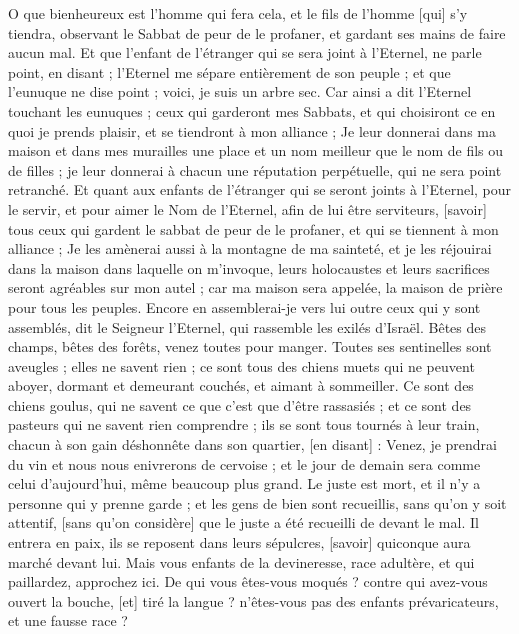 \begin{multicols}{2}
O que bienheureux est l'homme qui fera cela, et le fils de l'homme [qui] s'y tiendra, observant le Sabbat de peur de le profaner, et gardant ses mains de faire aucun mal.
Et que l'enfant de l'étranger qui se sera joint à l'Eternel, ne parle point, en disant ; l'Eternel me sépare entièrement de son peuple ; et que l'eunuque ne dise point ; voici, je suis un arbre sec.
Car ainsi a dit l'Eternel touchant les eunuques ; ceux qui garderont mes Sabbats, et qui choisiront ce en quoi je prends plaisir, et se tiendront à mon alliance ;
Je leur donnerai dans ma maison et dans mes murailles une place et un nom meilleur que le nom de fils ou de filles ; je leur donnerai à chacun une réputation perpétuelle, qui ne sera point retranché.
Et quant aux enfants de l'étranger qui se seront joints à l'Eternel, pour le servir, et pour aimer le Nom de l'Eternel, afin de lui être serviteurs, [savoir] tous ceux qui gardent le sabbat de peur de le profaner, et qui se tiennent à mon alliance ;
Je les amènerai aussi à la montagne de ma sainteté, et je les réjouirai dans la maison dans laquelle on m'invoque, leurs holocaustes et leurs sacrifices seront agréables sur mon autel ; car ma maison sera appelée, la maison de prière pour tous les peuples.
Encore en assemblerai-je vers lui outre ceux qui y sont assemblés, dit le Seigneur l'Eternel, qui rassemble les exilés d'Israël.
Bêtes des champs, bêtes des forêts, venez toutes pour manger.
Toutes ses sentinelles sont aveugles ; elles ne savent rien ; ce sont tous des chiens muets qui ne peuvent aboyer, dormant et demeurant couchés, et aimant à sommeiller.
Ce sont des chiens goulus, qui ne savent ce que c'est que d'être rassasiés ; et ce sont des pasteurs qui ne savent rien comprendre ; ils se sont tous tournés à leur train, chacun à son gain déshonnête dans son quartier, [en disant] :
Venez, je prendrai du vin et nous nous enivrerons de cervoise ; et le jour de demain sera comme celui d'aujourd'hui, même beaucoup plus grand.
\VerseOne{}Le juste est mort, et il n'y a personne qui y prenne garde ; et les gens de bien sont recueillis, sans qu'on y soit attentif, [sans qu'on considère] que le juste a été recueilli de devant le mal.
Il entrera en paix, ils se reposent dans leurs sépulcres, [savoir] quiconque aura marché devant lui.
Mais vous enfants de la devineresse, race adultère, et qui paillardez, approchez ici.
De qui vous êtes-vous moqués ? contre qui avez-vous ouvert la bouche, [et] tiré la langue ? n'êtes-vous pas des enfants prévaricateurs, et une fausse race ?

\end{multicols}
